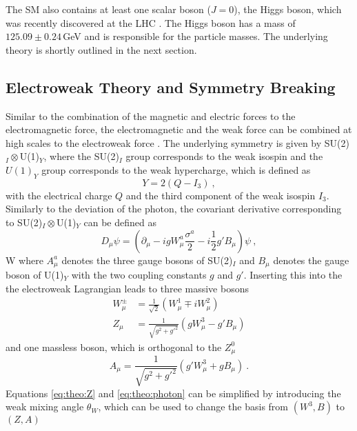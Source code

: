 \noindent The SM also contains at least one scalar boson ($J=0$), the Higgs boson, which was recently discovered at the LHC \cite{cms_higgsdiscov,atlas_higgsdiscov}. The Higgs boson has a mass of $125.09 \pm 0.24$\,GeV and is responsible for the particle masses. The underlying theory is shortly outlined in the next section.\\

\subsection{Electroweak Theory and Symmetry Breaking}
\label{subsec:theo:EWK}
Similar to the combination of the magnetic and electric forces to the electromagnetic force, the electromagnetic and the weak force can be combined at high scales to the electroweak force \cite{EWK}. The underlying symmetry is given by SU(2)$_I\otimes$U(1)$_Y$, where the SU(2)$_I$ group corresponds to the weak isospin and the $U(1)_Y$ group corresponds to the weak hypercharge, which is defined as
\begin{equation}
Y=2(Q-I_3) ~,
\end{equation}
with the electrical charge $Q$ and the third component of the weak isospin $I_3$. Similarly to the deviation of the photon, the covariant derivative corresponding to SU(2)$_I\otimes$U(1)$_Y$ can be defined as
\begin{equation}
D_\mu \psi = \left( \partial_\mu -igW_\mu^a\frac{\sigma^a}{2} - i\frac{1}{2}g'B_\mu \right)\psi ~,
\end{equation}W
where $A_\mu^a$ denotes the three gauge bosons of SU(2)$_I$ and $B_\mu$ denotes the gauge boson of U(1)$_Y$ with the two coupling constants $g$ and $g'$. Inserting this into the the electroweak Lagrangian leads to three massive bosons
\begin{align}
W_\mu^\pm &= \frac{1}{\sqrt{2}}\left( W_\mu^1 \mp iW_\mu^2 \right) \\
Z_\mu &= \frac{1}{\sqrt{g^2+g'^2}}\left( gW_\mu^3-g'B_\mu\right) \label{eq:theo:Z}
\end{align}
and one massless boson, which is orthogonal to the $Z_\mu^0$
\begin{equation}
A_\mu = \frac{1}{\sqrt{g^2+g'^2}}\left( g'W_\mu^3 + gB_\mu \right) ~. \label{eq:theo:photon}
\end{equation}
Equations \ref{eq:theo:Z} and \ref{eq:theo:photon} can be simplified by introducing the weak mixing angle $\theta_W$, which can be used to change the basis from $\left( W^3,B \right)$ to $\left( Z,A \right)$
